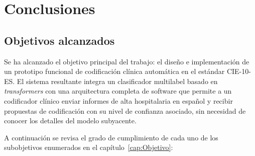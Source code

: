 \chapter{Conclusiones}
\label{cap:Conclusiones}

\section{Objetivos alcanzados}

Se ha alcanzado el objetivo principal del trabajo: el diseño e implementación de un prototipo funcional de codificación clínica automática en el estándar CIE-10-ES. El sistema resultante integra un clasificador multilabel basado en \emph{transformers} con una arquitectura completa de software que permite a un codificador clínico enviar informes de alta hospitalaria en español y recibir propuestas de codificación con su nivel de confianza asociado, sin necesidad de conocer los detalles del modelo subyacente.

A continuación se revisa el grado de cumplimiento de cada uno de los subobjetivos enumerados en el capítulo~\ref{cap:Objetivo}:


